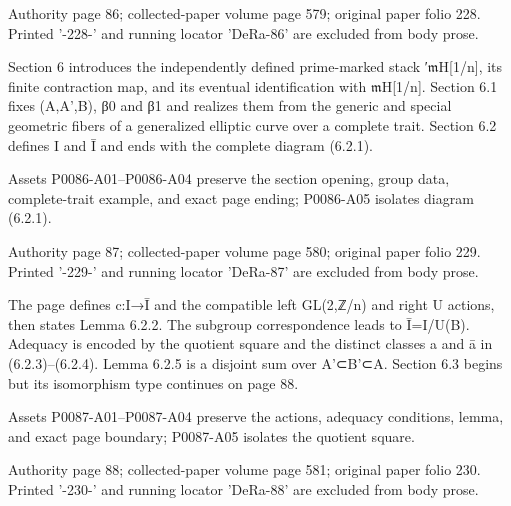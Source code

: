 \documentclass[11pt,a4paper]{article}
\begin{document}
\par\medskip
\hypertarget{D018-P0086}{}
\par\smallskip
Authority page 86; collected-paper volume page 579; original paper folio 228. Printed '-228-' and running locator 'DeRa-86' are excluded from body prose.

Section 6 introduces the independently defined prime-marked stack ′\ensuremath{\mathfrak{m}}\textunderscore{}H[1/n], its finite contraction map, and its eventual identification with \ensuremath{\mathfrak{m}}\textunderscore{}H[1/n]. Section 6.1 fixes (A,A',B), β\textunderscore{}0 and β\textunderscore{}1 and realizes them from the generic and special geometric fibers of a generalized elliptic curve over a complete trait. Section 6.2 defines I and Ī and ends with the complete diagram (6.2.1).

Assets P0086-A01--P0086-A04 preserve the section opening, group data, complete-trait example, and exact page ending; P0086-A05 isolates diagram (6.2.1).


\par\medskip
\hypertarget{D018-P0087}{}
\par\smallskip
Authority page 87; collected-paper volume page 580; original paper folio 229. Printed '-229-' and running locator 'DeRa-87' are excluded from body prose.

The page defines c:I→Ī and the compatible left GL(2,ℤ/n) and right U actions, then states Lemma 6.2.2. The subgroup correspondence leads to Ī=I/U(B). Adequacy is encoded by the quotient square and the distinct classes a and ā in (6.2.3)--(6.2.4). Lemma 6.2.5 is a disjoint sum over A'⊂B'⊂A. Section 6.3 begins but its isomorphism type continues on page 88.

Assets P0087-A01--P0087-A04 preserve the actions, adequacy conditions, lemma, and exact page boundary; P0087-A05 isolates the quotient square.


\par\medskip
\hypertarget{D018-P0088}{}
\par\smallskip
Authority page 88; collected-paper volume page 581; original paper folio 230. Printed '-230-' and running locator 'DeRa-88' are excluded from body prose.
\end{document}
